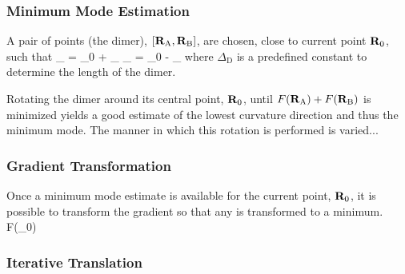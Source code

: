 \subsubsection{Minimum Mode Estimation}
A pair of points (the dimer), $[{\mathrm{\mathbf{\bm{R}}}}_\text{A}, {\mathrm{\mathbf{\bm{R}}}}_\text{B}]$, are chosen, close to current point ${\mathrm{\mathbf{\bm{R}}}}_0$, such that
\vR_ = \vR_0 + \Delta_\uvn \quad {} \quad \vR_ = \vR_0  - \Delta_\uvn
\eeq
where $\Delta_\text{D}$ is a predefined constant to determine the length of the dimer.

Rotating the dimer around its central point, ${\mathrm{\mathbf{\bm{R}}}}_0$, until $F({\mathrm{\mathbf{\bm{R}}}}_\text{A}) + F({\mathrm{\mathbf{\bm{R}}}}_\text{B})$ is minimized yields a good estimate of the lowest curvature direction and thus the minimum mode.
The manner in which this rotation is performed is varied...

\incomplete

\subsubsection{Gradient Transformation}
Once a minimum mode estimate is available for the current point, ${\mathrm{\mathbf{\bm{R}}}}_0$, it is possible to transform the gradient so that any  is transformed to a minimum.
\nabla{}F(\vR_0)
\eeq


\incomplete

\subsubsection{Iterative Translation}

\incomplete
